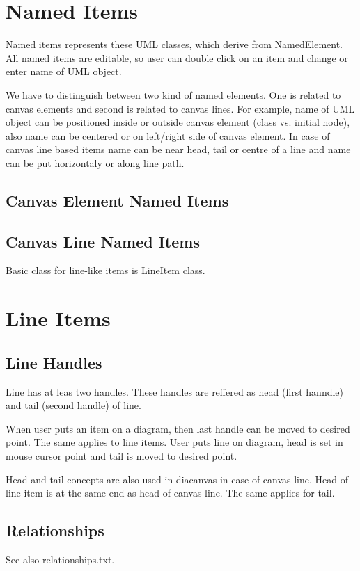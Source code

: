\documentclass{article}
\begin{document}
\section{Named Items}

Named items represents these UML classes, which derive from NamedElement.
All named items are editable, so user can double click on an item and
change or enter name of UML object.

We have to distinguish between two kind of named elements. One is related
to canvas elements and second is related to canvas lines. For example, name
of UML object can be positioned inside or outside canvas element (class vs.
initial node), also name can be centered or on left/right side of canvas
element. In case of canvas line based items name can be near head, tail
or centre of a line and name can be put horizontaly or along line path.

\subsection{Canvas Element Named Items}


\subsection{Canvas Line Named Items}
Basic class for line-like items is LineItem class.

\section{Line Items}
\subsection{Line Handles}
Line has at leas two handles. These handles are reffered as head (first
hanndle) and tail (second handle) of line.

When user puts an item on a diagram, then last handle can be moved to
desired point. The same applies to line items. User puts line on diagram,
head is set in mouse cursor point and tail is moved to desired point.

Head and tail concepts are also used in diacanvas in case of canvas line.
Head of line item is at the same end as head of canvas line. The same
applies for tail.

\subsection{Relationships}
See also relationships.txt.
\end{document}
